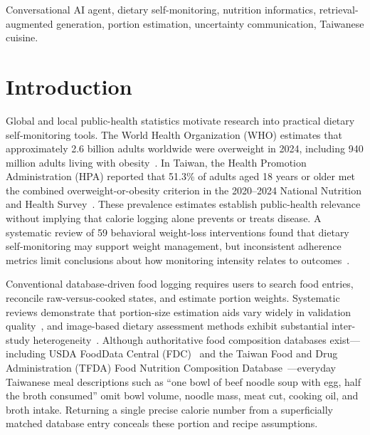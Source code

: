\documentclass[conference]{IEEEtran}
\begin{document}
\begin{IEEEkeywords}
Conversational AI agent, dietary self-monitoring, nutrition informatics, retrieval-augmented generation, portion estimation, uncertainty communication, Taiwanese cuisine.
\end{IEEEkeywords}

\section{Introduction}
Global and local public-health statistics motivate research into practical dietary self-monitoring tools. The World Health Organization (WHO) estimates that approximately 2.6 billion adults worldwide were overweight in 2024, including 940 million adults living with obesity~\cite{who2026obesity}. In Taiwan, the Health Promotion Administration (HPA) reported that 51.3\% of adults aged 18 years or older met the combined overweight-or-obesity criterion in the 2020--2024 National Nutrition and Health Survey~\cite{hpa2026obesity}. These prevalence estimates establish public-health relevance without implying that calorie logging alone prevents or treats disease. A systematic review of 59 behavioral weight-loss interventions found that dietary self-monitoring may support weight management, but inconsistent adherence metrics limit conclusions about how monitoring intensity relates to outcomes~\cite{raber2021systematic}.

Conventional database-driven food logging requires users to search food entries, reconcile raw-versus-cooked states, and estimate portion weights. Systematic reviews demonstrate that portion-size estimation aids vary widely in validation quality~\cite{amoutzopoulos2020portion}, and image-based dietary assessment methods exhibit substantial inter-study heterogeneity~\cite{ho2020validity}. Although authoritative food composition databases exist---including USDA FoodData Central (FDC)~\cite{usda_fdc} and the Taiwan Food and Drug Administration (TFDA) Food Nutrition Composition Database~\cite{tfda_database}---everyday Taiwanese meal descriptions such as ``one bowl of beef noodle soup with egg, half the broth consumed'' omit bowl volume, noodle mass, meat cut, cooking oil, and broth intake. Returning a single precise calorie number from a superficially matched database entry conceals these portion and recipe assumptions.
\end{document}
